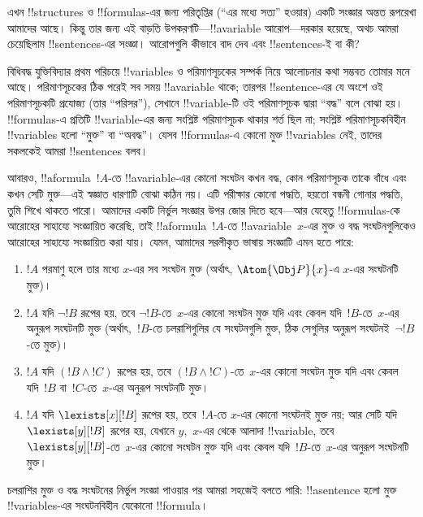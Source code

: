 \documentclass[../../../include/open-logic-section]{subfiles}
\begin{document}


এখন !!{structure}s ও !!{formula}s-এর জন্য পরিতৃপ্তির (“এর মধ্যে সত্য”
হওয়ার) একটি সংজ্ঞার অন্তত রূপরেখা আমাদের আছে। কিন্তু তার জন্য এই বাড়তি
উপকরণটি—!!a{variable} আরোপ—দরকার হয়েছে, অথচ আমরা চেয়েছিলাম
!!{sentence}s-এর সংজ্ঞা। আরোপগুলি কীভাবে বাদ দেব এবং !!{sentence}s-ই বা
কী?

বিধিবদ্ধ যুক্তিবিদ্যার প্রথম পরিচয়ে !!{variable}s ও পরিমাণসূচকের সম্পর্ক
নিয়ে আলোচনার কথা সম্ভবত তোমার মনে আছে। পরিমাণসূচকের ঠিক পরেই সব সময়
!!a{variable} থাকে; তারপর !!{sentence}-এর যে অংশে ওই পরিমাণসূচকটি প্রযোজ্য
(তার “পরিসর”), সেখানে !!{variable}-টি ওই পরিমাণসূচক দ্বারা “বদ্ধ” বলে
বোঝা হয়। !!{formula}s-এ প্রতিটি !!{variable}-এর জন্য সংশ্লিষ্ট পরিমাণসূচক
থাকার শর্ত ছিল না; সংশ্লিষ্ট পরিমাণসূচকবিহীন !!{variable}s হলো “মুক্ত” বা
“অবদ্ধ”। যেসব !!{formula}s-এ কোনো মুক্ত !!{variable}s নেই, তাদের সকলকেই
আমরা !!{sentence}s বলব।

আবারও, !!a{formula}~$!A$-তে !!a{variable}-এর কোনো সংঘটন কখন বদ্ধ, কোন
পরিমাণসূচক তাকে বাঁধে এবং কখন সেটি মুক্ত—এই স্বজ্ঞাত ধারণাটি বোঝা কঠিন
নয়। এটি পরীক্ষার কোনো পদ্ধতি, হয়তো বন্ধনী গোনার পদ্ধতি, তুমি শিখে
থাকতে পারো। আমাদের একটি নির্ভুল সংজ্ঞার উপর জোর দিতে হবে—আর যেহেতু
!!{formula}s-কে আরোহের সাহায্যে সংজ্ঞায়িত করেছি, তাই !!a{formula}~$!A$-তে
!!a{variable}~$x$-এর মুক্ত ও বদ্ধ সংঘটনগুলিকেও আরোহের সাহায্যে সংজ্ঞায়িত
করা যায়। যেমন, আমাদের সরলীকৃত ভাষায় সংজ্ঞাটি এমন হতে পারে:
\begin{enumerate}
  \item $!A$ পরমাণু হলে তার মধ্যে $x$-এর সব সংঘটন মুক্ত (অর্থাৎ,
  $\Atom{\Obj P}{x}$-এ $x$-এর সংঘটনটি মুক্ত)।
  \item $!A$ যদি $\lnot !B$ রূপের হয়, তবে $\lnot !B$-তে~$x$-এর কোনো
  সংঘটন মুক্ত যদি এবং কেবল যদি~$!B$-তে~$x$-এর অনুরূপ সংঘটনটি মুক্ত
  (অর্থাৎ,~$!B$-তে চলরাশিগুলির যে সংঘটনগুলি মুক্ত, ঠিক সেগুলির অনুরূপ
  সংঘটনই~$\lnot !B$-তে মুক্ত)।
  \item $!A$ যদি $(!B \land !C)$ রূপের হয়, তবে $(!B \land !C)$-তে~$x$-এর
  কোনো সংঘটন মুক্ত যদি এবং কেবল যদি~$!B$ বা~$!C$-তে~$x$-এর অনুরূপ
  সংঘটনটি মুক্ত।
  \item $!A$ যদি $\lexists[x][!B]$ রূপের হয়, তবে~$!A$-তে $x$-এর কোনো
  সংঘটনই মুক্ত নয়; আর সেটি যদি $\lexists[y][!B]$ রূপের হয়, যেখানে
  $y$,~$x$-এর থেকে আলাদা !!{variable}, তবে $\lexists[y][!B]$-তে~$x$-এর
  কোনো সংঘটন মুক্ত যদি এবং কেবল যদি~$!B$-তে~$x$-এর অনুরূপ সংঘটনটি মুক্ত।
\end{enumerate}

চলরাশির মুক্ত ও বদ্ধ সংঘটনের নির্ভুল সংজ্ঞা পাওয়ার পর আমরা সহজেই বলতে
পারি: !!a{sentence} হলো মুক্ত !!{variable}s-এর সংঘটনবিহীন যেকোনো
!!{formula}।
\end{document}
